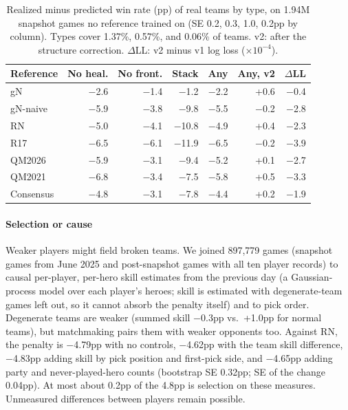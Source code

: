 \documentclass[journal]{IEEEtran}
\begin{document}
\begin{table}[t]
\centering
\caption{Realized minus predicted win rate (pp) of real teams by type, on 1.94M snapshot games no reference trained on (SE 0.2, 0.3, 1.0, 0.2pp by column). Types cover 1.37\%, 0.57\%, and 0.06\% of teams. v2: after the structure correction. $\Delta$LL: v2 minus v1 log loss ($\times 10^{-4}$).}
\label{tab:compaudit}
\setlength{\tabcolsep}{3pt}
\small
\begin{tabular}{lrrrr|rr}
\toprule
Reference & No heal. & No front. & Stack & Any & Any, v2 & $\Delta$LL \\
\midrule
gN & $-$2.6 & $-$1.4 & $-$1.2 & $-$2.2 & +0.6 & $-$0.4 \\
gN-naive & $-$5.9 & $-$3.8 & $-$9.8 & $-$5.5 & $-$0.2 & $-$2.8 \\
RN & $-$5.0 & $-$4.1 & $-$10.8 & $-$4.9 & +0.4 & $-$2.3 \\
R17 & $-$6.5 & $-$6.1 & $-$11.9 & $-$6.5 & $-$0.2 & $-$3.9 \\
QM2026 & $-$5.9 & $-$3.1 & $-$9.4 & $-$5.2 & +0.1 & $-$2.7 \\
QM2021 & $-$6.8 & $-$3.4 & $-$7.5 & $-$5.8 & +0.5 & $-$3.3 \\
Consensus & $-$4.8 & $-$3.1 & $-$7.8 & $-$4.4 & +0.2 & $-$1.9 \\
\bottomrule
\end{tabular}
\end{table}

\paragraph{Selection or cause} Weaker players might field broken teams. We joined 897,779 games (snapshot games from June 2025 and post-snapshot games with all ten player records) to causal per-player, per-hero skill estimates from the previous day (a Gaussian-process model over each player's heroes; skill is estimated with degenerate-team games left out, so it cannot absorb the penalty itself) and to pick order. Degenerate teams are weaker (summed skill $-$0.3pp vs.\ +1.0pp for normal teams), but matchmaking pairs them with weaker opponents too. Against RN, the penalty is $-$4.79pp with no controls, $-$4.62pp with the team skill difference, $-$4.83pp adding skill by pick position and first-pick side, and $-$4.65pp adding party and never-played-hero counts (bootstrap SE 0.32pp; SE of the change 0.04pp). At most about 0.2pp of the 4.8pp is selection on these measures. Unmeasured differences between players remain possible.
\end{document}
